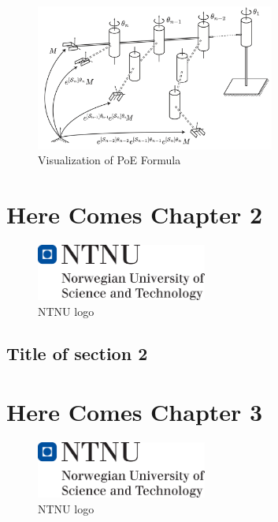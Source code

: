 \documentclass{tpk4170report}
\begin{document}
\begin{figure}
  \centering
  \includegraphics[width=0.7\textwidth]{assets/PoE_Visualization.pdf} 
  \caption{Visualization of PoE Formula}
  \label{fig:PoE_Visualization}
\end{figure}



\chapter{Here Comes Chapter 2}

\Blindtext

\begin{figure}
  \centering
  \includegraphics[width=0.5\textwidth]{hovedlogo} 
  \caption{NTNU logo}
  \label{fig:logo2}
\end{figure}

\section{Title of section 2}








\chapter{Here Comes Chapter 3}

\Blindtext

\begin{figure}
  \centering
  \includegraphics[width=0.5\textwidth]{hovedlogo} 
  \caption{NTNU logo}
  \label{fig:logo}
\end{figure}
\end{document}
